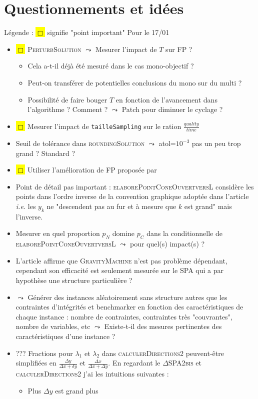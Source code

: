 \section{Questionnements et idées}
Légende : \hl{$\Box$} signifie "point important"
Pour le 17/01
\begin{itemize}
    \item \hl{$\Box$} \textsc{PerturbSolution} $\leadsto$ Mesurer l'impact de $T$ sur FP ?
    \begin{itemize}
        \item Cela a-t-il déjà été mesuré dans le cas mono-objectif ?
        \item Peut-on transférer de potentielles conclusions du mono sur du multi ?
        \item Possibilité de faire bouger $T$ en fonction de l'avancement dans l'algorithme ? Comment ? $\leadsto$ Patch pour diminuer le cyclage ?
    \end{itemize}
    \item \hl{$\Box$} Mesurer l'impact de \texttt{tailleSampling} sur le ration $\frac{quality}{time}$
    \item Seuil de tolérance dans \textsc{roundingSolution} $\leadsto$ atol=$10^{-3}$ pas un peu trop grand ? Standard ?
    \item \hl{$\Box$} Utiliser l'amélioration de FP proposée par~\cite{improvedFP}
    \item Point de détail pas important : \textsc{elaborePointConeOuvertversL} considère les points dans l'ordre inverse de la convention graphique adoptée dans l'article \textit{i.e.} les $y_k$ ne "descendent pas au fur et à mesure que $k$ est grand" mais l'inverse. 
    \item Mesurer en quel proportion $p_N$ domine $p_C$ dans la conditionnelle de \textsc{elaborePointConeOuvertversL} $\leadsto$ pour quel(s) impact(s) ?
    \item L'article affirme que \textsc{GravityMachine} n'est pas problème dépendant, cependant son efficacité est seulement mesurée sur le SPA qui a par hypothèse une structure particulière ?
    \item $\leadsto$ Générer des instances aléatoirement sans structure autres que les contraintes d'intégrités et benchmarker en fonction des caractéristiques de chaque instance : nombre de contraintes, contraintes très "couvrantes", nombre de variables, etc $\leadsto$ Existe-t-il des mesures pertinentes des caractéristiques d'une instance ?
    \item ??? Fractions pour $\lambda_1$ et $\lambda_2$ dans \textsc{calculerDirections2} peuvent-être simplifiées en $\frac{\Delta y}{\Delta x + \delta y}$ et $\frac{\Delta x}{\Delta x + \Delta y}$. En regardant le \textsc{$\Delta$SPA2bis} et \textsc{calculerDirections2} j'ai les intuitions suivantes :
    \begin{itemize}
        \item Plus $\Delta y$ est grand plus 
    \end{itemize}
\end{itemize}
